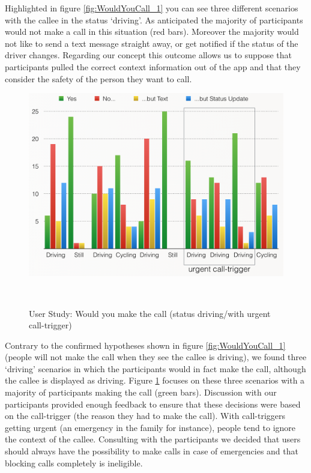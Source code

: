 \documentclass{sigchi}
\begin{document}
Highlighted in figure \ref{fig:WouldYouCall_1} you can see three different scenarios with the callee in the status `driving'. As anticipated the majority of participants would not make a call in this situation (red bars). Moreover the majority would not like to send a text message straight away, or get notified if the status of the driver changes. Regarding our concept this outcome allows us to suppose that participants pulled the correct context information out of the app and that they consider the safety of the person they want to call.

\begin{figure}[H]
\centering
  \includegraphics[width=0.9\columnwidth]{figures/WouldYouCall_2}
  \caption{User Study: Would you make the call (status driving/with urgent call-trigger)}~\label{fig:WouldYouCall_2}
\end{figure}

Contrary to the confirmed hypotheses shown in figure \ref{fig:WouldYouCall_1} (people will not make the call when they see the callee is driving), we found three `driving' scenarios in which the participants would in fact make the call, although the callee is displayed as driving. Figure \ref{fig:WouldYouCall_2} focuses on these three scenarios with a majority of participants making the call (green bars). Discussion with our participants provided enough feedback to ensure that these decisions were based on the call-trigger (the reason they had to make the call). With call-triggers getting urgent (an emergency in the family for instance), people tend to ignore the context of the callee. Consulting with the participants we decided that users should always have the possibility to make calls in case of emergencies and that blocking calls completely is ineligible.
\end{document}
